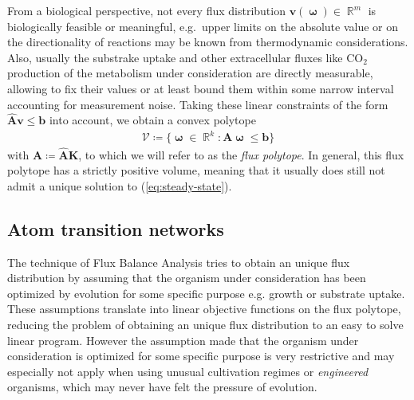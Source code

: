 \documentclass[10pt]{article}
\newcommand{\eg}{e.g.~}
\newcommand{\mb}[1]{\mathbf{#1}}
\DeclareMathOperator\Reals{\mathbb{R}}
\DeclareMathOperator\bomega{\boldsymbol{\omega}}
\begin{document}
From a biological perspective, not every flux distribution $\mb{v}(\bomega) \in \Reals^m$ is biologically feasible or meaningful,
\eg upper limits on the absolute value or on the directionality of reactions may be known from thermodynamic considerations.
Also, usually the substrake uptake and other extracellular fluxes like $\mathrm{CO}_2$ production of the 
metabolism under consideration are directly measurable, allowing to fix their values or 
at least bound them within some narrow interval accounting for measurement noise. 
Taking these linear constraints of the form $\mb{\hat{A}}\mb{v} \leq \mb{b}$ into account, we obtain a convex polytope 
\begin{align}
    \mathcal{V} \coloneqq \big\{ \bomega \in \Reals^k : \mb{A}\bomega \leq \mb{b} \big\}
    \label{eq:convex-polytope}
\end{align}
with $\mb{A} \coloneqq \mb{\hat{A}}\mb{K}$, to which we will refer to as the \emph{flux polytope}.
In general, this flux polytope has a strictly positive volume, meaning that it usually does still not admit 
a unique solution to (\ref{eq:steady-state}).

\subsection{Atom transition networks}
\label{sec:atom-transition-networks}

The technique of Flux Balance Analysis tries to obtain an unique flux distribution by assuming that the
organism under consideration has been optimized by evolution for some specific purpose e.g. growth or 
substrate uptake. 
These assumptions translate into linear objective functions on the flux polytope, 
reducing the problem of obtaining an unique flux distribution to an easy to solve linear program.
However the assumption made that the organism under consideration is optimized for some specific purpose
is very restrictive and may especially not apply when using unusual cultivation regimes or \emph{engineered}
organisms, which may never have felt the pressure of evolution.
\end{document}
